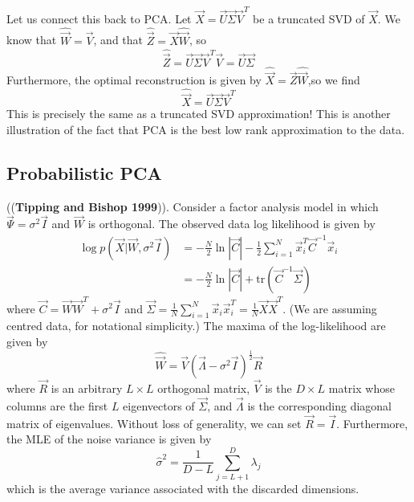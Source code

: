 Let us connect this back to PCA. Let $\vec{X}=\vec{U}\vec{\Sigma}\vec{V}^T$ be a truncated SVD of $\vec{X}$. We know that $\hat{\vec{W}}=\vec{V}$, and that $\hat{\vec{Z}}=\vec{X}\hat{\vec{W}}$, so
\begin{equation}
\hat{\vec{Z}}=\vec{U}\vec{\Sigma}\vec{V}^T\vec{V}=\vec{U}\vec{\Sigma}
\end{equation}
Furthermore, the optimal reconstruction is given by $\hat{\vec{X}}=\vec{Z}\hat{\vec{W}}$,so we find
\begin{equation}
\hat{\vec{X}}=\vec{U}\vec{\Sigma}\vec{V}^T
\end{equation}
This is precisely the same as a truncated SVD approximation! This is another illustration of the fact that PCA is the best low rank approximation to the data.


\subsection{Probabilistic PCA}
\begin{theorem}((\textbf{Tipping and Bishop 1999})).
Consider a factor analysis model in which $\vec{\Psi}=\sigma^2\vec{I}$ and $\vec{W}$ is orthogonal. The observed data log likelihood is given by
\begin{align}
\log p(\vec{X}|\vec{W},\sigma^2\vec{I}) & =-\frac{N}{2}\ln|\vec{C}|-\frac{1}{2}\sum\limits_{i=1}^N \vec{x}_i^T\vec{C}^{-1}\vec{x}_i \nonumber \\
   & =-\frac{N}{2}\ln|\vec{C}|+\mathrm{tr}(\vec{C}^{-1}\vec{\Sigma})
\end{align}
where $\vec{C}=\vec{W}\vec{W}^T+\sigma^2\vec{I}$ and $\vec{\Sigma}=\frac{1}{N}\sum_{i=1}^N \vec{x}_i\vec{x}_i^T=\frac{1}{N}\vec{X}\vec{X}^T$. (We are assuming centred data, for notational simplicity.) The maxima of the log-likelihood are given by
\begin{equation}
\hat{\vec{W}}=\vec{V}(\vec{\Lambda}-\sigma^2\vec{I})^{\frac{1}{2}}\vec{R}
\end{equation}
where $\vec{R}$ is an arbitrary $L \times L$ orthogonal matrix, $\vec{V}$ is the $D \times L$ matrix whose columns are the first $L$ eigenvectors of $\vec{\Sigma}$, and $\vec{\Lambda}$ is the corresponding diagonal matrix of eigenvalues. Without loss of generality, we can set $\vec{R}=\vec{I}$. Furthermore, the MLE of the noise variance is given by
\begin{equation}
\hat{\sigma}^2=\frac{1}{D-L}\sum\limits_{j=L+1}^D \lambda_j
\end{equation}
which is the average variance associated with the discarded dimensions.
\end{theorem}

